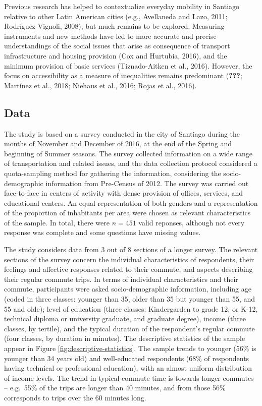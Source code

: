 \documentclass[]{elsarticle} %
\begin{document}
Previous research has helped to contextualize everyday mobility in
Santiago relative to other Latin American cities (e.g., Avellaneda and
Lazo, 2011; Rodríguez Vignoli, 2008), but much remains to be explored.
Measuring instruments and new methods have led to more accurate and
precise understandings of the social issues that arise as consequence of
transport infrastructure and housing provision (Cox and Hurtubia, 2016),
and the minimum provision of basic services (Tiznado-Aitken et al.,
2016). However, the focus on accessibility as a measure of inequalities
remains predominant ({\textbf{???}}; Martínez et al., 2018; Niehaus et
al., 2016; Rojas et al., 2016).

\hypertarget{data}{%
\subsection{Data}\label{data}}

The study is based on a survey conducted in the city of Santiago during
the months of November and December of 2016, at the end of the Spring
and beginning of Summer seasons. The survey collected information on a
wide range of transportation and related issues, and the data collection
protocol considered a quota-sampling method for gathering the
information, considering the socio-demographic information from
Pre-Census of 2012. The survey was carried out face-to-face in centers
of activity with dense provision of offices, services, and educational
centers. An equal representation of both genders and a representation of
the proportion of inhabitants per area were chosen as relevant
characteristics of the sample. In total, there were \(n=451\) valid
reponses, although not every response was complete and some questions
have missing values.

The study considers data from 3 out of 8 sections of a longer survey.
The relevant sections of the survey concern the individual
characteristics of respondents, their feelings and affective responses
related to their commute, and aspects describing their regular commute
trips. In terms of individual characteristics and their commute,
participants were asked socio-demographic information, including age
(coded in three classes: younger than 35, older than 35 but younger than
55, and 55 and olde); level of education (three classes: Kindergarden to
grade 12, or K-12, technical diploma or university graduate, and
graduate degree), income (three classes, by tertile), and the typical
duration of the respondent's regular commute (four classes, by duration
in minutes). The descriptive statistics of the sample appear in Figure
\ref{fig:descriptive-statistics}. The sample trends to younger (56\% is
younger than 34 years old) and well-educated respondents (68\% of
respondents having technical or professional education), with an almost
uniform distribution of income levels. The trend in typical commute time
is towards longer commutes -- e.g.~55\% of the trips are longer than 40
minutes, and from those 56\% corresponds to trips over the 60 minutes
long.
\end{document}
